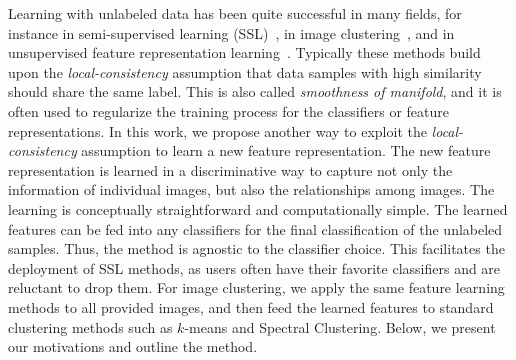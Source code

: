 Learning with unlabeled data has been quite successful in many fields, for instance in semi-supervised learning 
(SSL)~\citep{Zhou:nips:04, deep:semi:embedding, Fergus09, SemiForest, Zhu:ISL:2009, 
nips14:ssl}, in image clustering~\citep{Grauman06, Frey_AffinityPropagation, dai}, and in 
unsupervised feature representation learning~\citep{stl-10, cnnfet14, feature:LSTM, feature:video}. 
Typically these methods build upon the
\emph{local-consistency} assumption that data samples with high
similarity should share the same label. This is also called
\emph{smoothness of manifold}, and it is often used to regularize the training process for the classifiers or feature
 representations.  
In this work, we propose another way to exploit the \emph{local-consistency} assumption to 
learn a new feature representation. 
The new feature
representation is learned in a discriminative way to capture not only
the information of individual images, but also the relationships among
images. The learning is conceptually straightforward and
computationally simple. The learned features can be fed into any
classifiers for the final classification of the unlabeled samples.
Thus, the method is agnostic to the classifier choice. This facilitates the
deployment of SSL methods, as users often have their favorite
classifiers and are reluctant to drop them. For image clustering, we
apply the same feature learning methods to all provided images, and
then feed the learned features to standard clustering methods such as
$k$-means and Spectral Clustering.  Below, we present our motivations
and outline the method.

